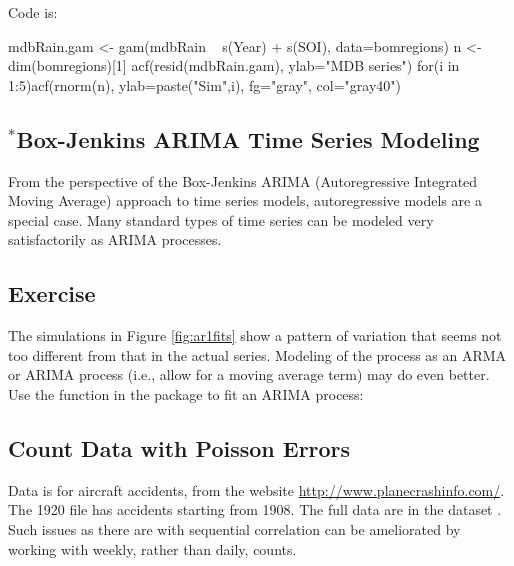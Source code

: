 Code is:
\begin{Schunk}
\begin{Sinput}
mdbRain.gam <- gam(mdbRain ~ s(Year) + s(SOI),
                   data=bomregions)
n <-  dim(bomregions)[1]
acf(resid(mdbRain.gam), ylab="MDB series")
for(i in 1:5)acf(rnorm(n), ylab=paste("Sim",i),
                 fg="gray", col="gray40")
\end{Sinput}
\end{Schunk}

\subsection{$^*$Box-Jenkins ARIMA Time Series Modeling}

From the perspective of the Box-Jenkins ARIMA (Autoregressive
Integrated Moving Average) approach to time series models,
autoregressive models are a special case.  Many standard types of time
series can be modeled very satisfactorily as ARIMA processes.

\subsection*{Exercise}
The simulations in Figure \ref{fig:ar1fits} show a pattern of
  variation that seems not too different from that in the actual series.
  Modeling of the process as an ARMA or ARIMA process (i.e., allow
  for a moving average term) may do even better.  Use the
   function in the  package to fit an
  ARIMA process:

\subsection{Count Data with Poisson Errors}


Data is for aircraft accidents, from the website
\url{http://www.planecrashinfo.com/}.  The 1920 file has
accidents starting from 1908. The full data are in the
dataset .
Such issues as there are with sequential correlation
can be ameliorated by working with weekly, rather than daily,
counts. 




